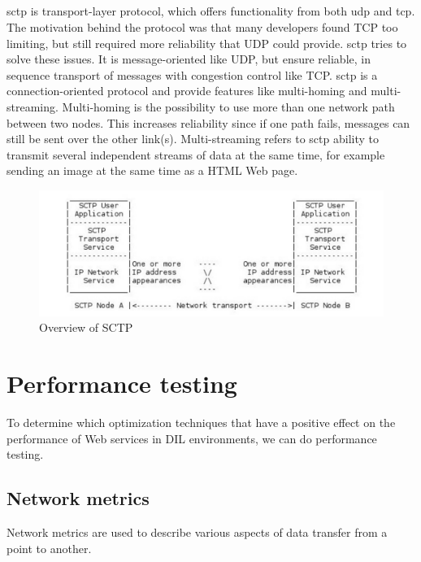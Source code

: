 \subsection{}

\gls{sctp} is transport-layer protocol, which offers functionality from both
\gls{udp} and \gls{tcp}\cite{rfc-sctp}. The motivation behind the protocol was
that many developers found TCP too limiting, but still required more reliability
that UDP could provide. \gls{sctp} tries to solve these issues. It is
message-oriented like UDP, but ensure reliable, in sequence transport of
messages with congestion control like TCP. \gls{sctp} is a connection-oriented
protocol and provide features like multi-homing and multi-streaming.
Multi-homing is the possibility to use more than one network path between two
nodes. This increases reliability since if one path fails, messages can still be
sent over the other link(s). Multi-streaming refers to \gls{sctp} ability to
transmit several independent streams of data at the same time, for example
sending an image at the same time as a HTML Web page.

\begin{figure}[h]
\includegraphics[scale=0.5]{images/sctp.pdf}
\caption{Overview of SCTP}
\end{figure}

\section{Performance testing}

To determine which optimization techniques that have a positive effect on the
performance of Web services in DIL environments, we can do performance testing.

\subsection{Network metrics}

Network metrics are used to describe various aspects of data transfer from a
point to another.

